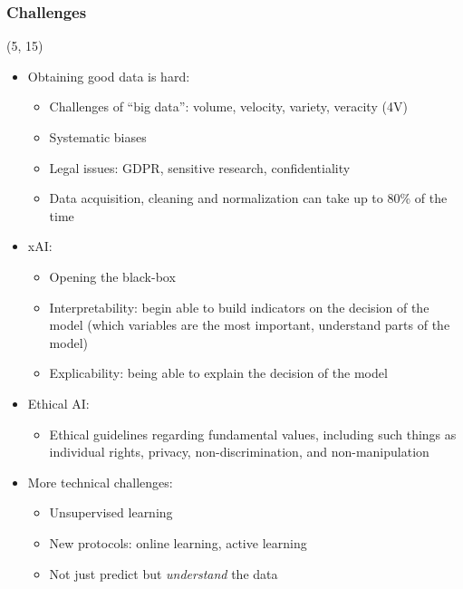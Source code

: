 \begin{frame}
  \frametitle{Challenges}

  \begin{textblock}{90}(5, 15)
    \begin{itemize}
    \item<1-> Obtaining good data is hard:
      \begin{itemize}
      \item Challenges of ``big data'': volume, velocity, variety, veracity (4V)
      \item Systematic biases
      \item Legal issues: GDPR, sensitive research, confidentiality
      \item Data acquisition, cleaning and normalization can take up to 80\% of
        the time
      \end{itemize}
    \item<2-> \acl{xAI}:
      \begin{itemize}
      \item Opening the black-box
      \item Interpretability: begin able to build indicators on the decision of the model
        (which variables are the most important, understand parts of the model)
      \item Explicability: being able to explain the decision of the model
      \end{itemize}
    \item<3-> Ethical \ac{AI}:
      \begin{itemize}
      \item Ethical guidelines regarding fundamental values, including such things as individual rights, privacy, non-discrimination, and non-manipulation
      \end{itemize}
    \item<4-> More technical challenges:
      \begin{itemize}
      \item Unsupervised learning
      \item New protocols: online learning, active learning
      \item Not just predict but \emph{understand} the data
      \end{itemize}
    \end{itemize}
  \end{textblock}
\end{frame}
